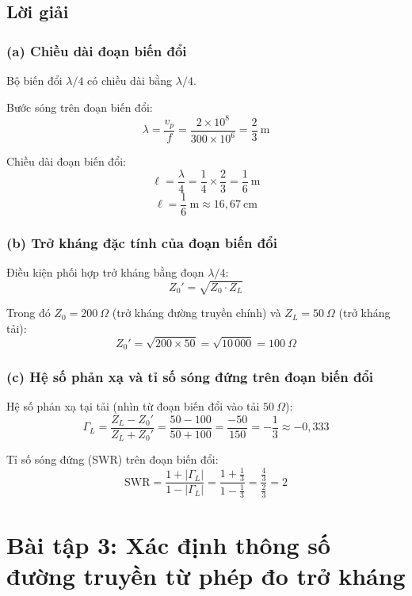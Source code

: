 \documentclass[12pt,a4paper]{article}
\begin{document}
\subsection{Lời giải}

\subsubsection{(a) Chiều dài đoạn biến đổi}

Bộ biến đổi $\lambda/4$ có chiều dài bằng $\lambda/4$.

Bước sóng trên đoạn biến đổi:
\[
\lambda = \frac{v_p}{f} = \frac{2 \times 10^8}{300 \times 10^6} = \frac{2}{3}~\text{m}
\]

Chiều dài đoạn biến đổi:
\[
\ell = \frac{\lambda}{4} = \frac{1}{4} \times \frac{2}{3} = \frac{1}{6}~\text{m}
\]
\[
\boxed{\ell = \frac{1}{6}~\text{m} \approx 16{,}67~\text{cm}}
\]

\subsubsection{(b) Trở kháng đặc tính của đoạn biến đổi}

Điều kiện phối hợp trở kháng bằng đoạn $\lambda/4$:
\[
Z_0' = \sqrt{Z_0 \cdot Z_L}
\]

Trong đó $Z_0 = 200~\Omega$ (trở kháng đường truyền chính) và $Z_L = 50~\Omega$ (trở kháng tải):
\[
Z_0' = \sqrt{200 \times 50} = \sqrt{10\,000} = \boxed{100~\Omega}
\]

\subsubsection{(c) Hệ số phản xạ và tỉ số sóng đứng trên đoạn biến đổi}

Hệ số phản xạ tại tải (nhìn từ đoạn biến đổi vào tải $50~\Omega$):
\[
\Gamma_L = \frac{Z_L - Z_0'}{Z_L + Z_0'} = \frac{50 - 100}{50 + 100} = \frac{-50}{150} = \boxed{-\frac{1}{3} \approx -0{,}333}
\]

Tỉ số sóng đứng (SWR) trên đoạn biến đổi:
\[
\text{SWR} = \frac{1 + |\Gamma_L|}{1 - |\Gamma_L|} = \frac{1 + \frac{1}{3}}{1 - \frac{1}{3}} = \frac{\frac{4}{3}}{\frac{2}{3}} = \boxed{2}
\]

\newpage
\section{Bài tập 3: Xác định thông số đường truyền từ phép đo trở kháng}
\end{document}

